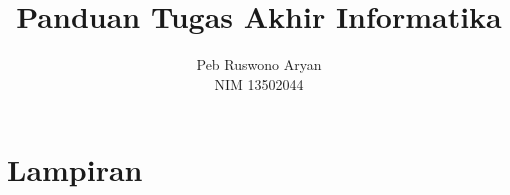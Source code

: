 \documentclass[12pt, a4paper, onecolumn, oneside, final]{report}
\begin{document}
    \title{Panduan Tugas Akhir Informatika}
    \date{}
    \author{
        Peb Ruswono Aryan \\
        NIM 13502044
    }

    \setcounter{page}{0}

    
    

    \pagestyle{plain}

    
    
    

    \tableofcontents
    \listoffigures
    \listoftables

    \setcounter{page}{0}

    
    
    
    
    

    \printbibliography

    \appendix

    \part*{Lampiran}

    
    
\end{document}
